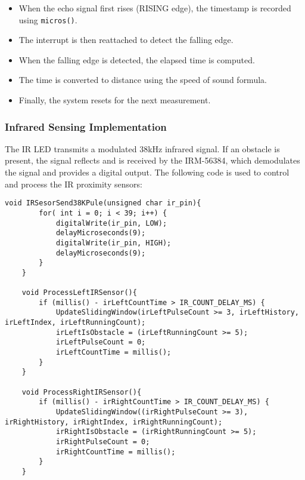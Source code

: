 \begin{itemize}
	\item When the echo signal first rises (RISING edge), the timestamp is recorded using \texttt{micros()}.
	\item The interrupt is then reattached to detect the falling edge.
	\item When the falling edge is detected, the elapsed time is computed.
	\item The time is converted to distance using the speed of sound formula.
	\item Finally, the system resets for the next measurement.
\end{itemize}


\subsubsection{Infrared Sensing Implementation}
The IR LED transmits a modulated 38kHz infrared signal. If an obstacle is present, the signal reflects and is received by the IRM-56384, which demodulates the signal and provides a digital output. The following code is used to control and process the IR proximity sensors:
\begin{lstlisting}[style=cppstyle2]
	void IRSesorSend38KPule(unsigned char ir_pin){
		for( int i = 0; i < 39; i++) {
			digitalWrite(ir_pin, LOW);
			delayMicroseconds(9);
			digitalWrite(ir_pin, HIGH);
			delayMicroseconds(9);
		}
	}
	
	void ProcessLeftIRSensor(){
		if (millis() - irLeftCountTime > IR_COUNT_DELAY_MS) {
			UpdateSlidingWindow(irLeftPulseCount >= 3, irLeftHistory, irLeftIndex, irLeftRunningCount);    
			irLeftIsObstacle = (irLeftRunningCount >= 5);
			irLeftPulseCount = 0;
			irLeftCountTime = millis();
		}
	}
	
	void ProcessRightIRSensor(){
		if (millis() - irRightCountTime > IR_COUNT_DELAY_MS) {
			UpdateSlidingWindow((irRightPulseCount >= 3), irRightHistory, irRightIndex, irRightRunningCount);
			irRightIsObstacle = (irRightRunningCount >= 5);
			irRightPulseCount = 0;
			irRightCountTime = millis();
		}
	}
\end{lstlisting}
